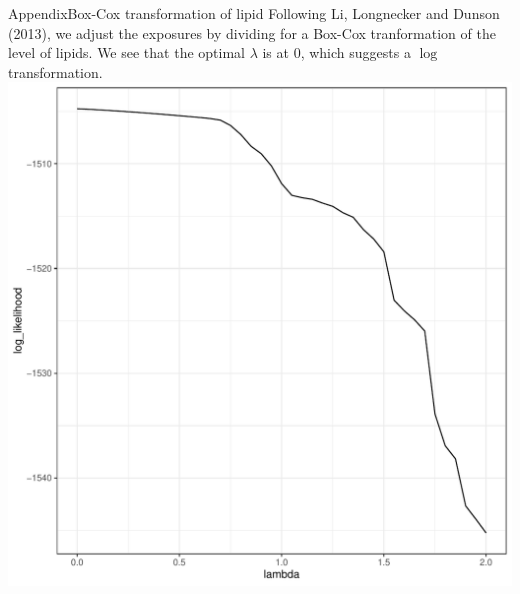 \documentclass{beamer}\usepackage[]{graphicx}\usepackage[]{color}
\makeatletter
\def\maxwidth{ %
  \ifdim\Gin@nat@width>\linewidth
    \linewidth
  \else
    \Gin@nat@width
  \fi
}
\newenvironment{knitrout}{}{} %
\makeatother
\begin{document}
\begin{frame}{Appendix}{Box-Cox transformation of lipid}
Following Li, Longnecker and Dunson (2013), we adjust the exposures by dividing for a Box-Cox tranformation of the level of lipids. We see that the optimal $\lambda$ is at 0, which suggests a $\log$ transformation. 
\begin{knitrout}
\color{fgcolor}
\includegraphics[width=\maxwidth]{figure/unnamed-chunk-5-1} 

\end{knitrout}


\end{frame}
\end{document}
